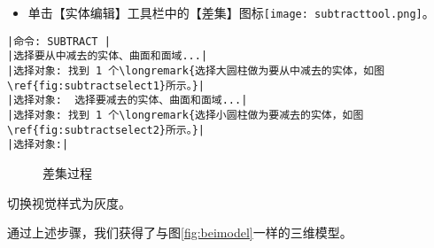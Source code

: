 \begin{procedure}
\begin{itemize}
\item 单击【实体编辑】工具栏中的【差集】图标\texttt{[image: subtracttool.png]}。
\end{itemize}
\begin{lstlisting}
|命令: SUBTRACT |
|选择要从中减去的实体、曲面和面域...|
|选择对象: 找到 1 个\longremark{选择大圆柱做为要从中减去的实体，如图\ref{fig:subtractselect1}所示。}|
|选择对象:  选择要减去的实体、曲面和面域...|
|选择对象: 找到 1 个\longremark{选择小圆柱做为要减去的实体，如图\ref{fig:subtractselect2}所示。}|
|选择对象:|
\end{lstlisting}
\begin{figure}[htbp]
\centering
{}\hspace{20pt}
\caption{差集过程}
\end{figure}
\showremarks
\item 切换视觉样式为灰度。
\end{procedure}

通过上述步骤，我们获得了与图\ref{fig:beimodel}一样的三维模型。
\endinput